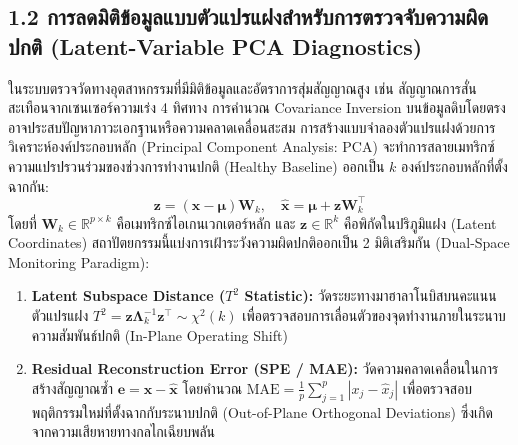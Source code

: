\documentclass[12pt,a4paper]{article}
\begin{document}
\subsection*{1.2 การลดมิติข้อมูลแบบตัวแปรแฝงสำหรับการตรวจจับความผิดปกติ (Latent-Variable PCA Diagnostics)}
\vspace{-4pt}

ในระบบตรวจวัดทางอุตสาหกรรมที่มีมิติข้อมูลและอัตราการสุ่มสัญญาณสูง เช่น สัญญาณการสั่นสะเทือนจากเซนเซอร์ความเร่ง 4 ทิศทาง การคำนวณ Covariance Inversion บนข้อมูลดิบโดยตรงอาจประสบปัญหาภาวะเอกฐานหรือความคลาดเคลื่อนสะสม การสร้างแบบจำลองตัวแปรแฝงด้วยการวิเคราะห์องค์ประกอบหลัก (Principal Component Analysis: PCA) จะทำการสลายเมทริกซ์ความแปรปรวนร่วมของช่วงการทำงานปกติ (Healthy Baseline) ออกเป็น $k$ องค์ประกอบหลักที่ตั้งฉากกัน:
\vspace{-2pt}
\begin{equation}
\mathbf{z} = (\mathbf{x} - \boldsymbol{\mu}) \mathbf{W}_k, \quad \hat{\mathbf{x}} = \boldsymbol{\mu} + \mathbf{z} \mathbf{W}_k^\top
\end{equation}
\vspace{-2pt}
โดยที่ $\mathbf{W}_k \in \mathbb{R}^{p \times k}$ คือเมทริกซ์ไอเกนเวกเตอร์หลัก และ $\mathbf{z} \in \mathbb{R}^k$ คือพิกัดในปริภูมิแฝง (Latent Coordinates) สถาปัตยกรรมนี้แบ่งการเฝ้าระวังความผิดปกติออกเป็น 2 มิติเสริมกัน (Dual-Space Monitoring Paradigm):
\begin{enumerate}[leftmargin=1.8em, itemsep=0pt, topsep=1pt, parsep=0pt]
    \item \textbf{Latent Subspace Distance ($T^2$ Statistic):} วัดระยะทางมาฮาลาโนบิสบนคะแนนตัวแปรแฝง $T^2 = \mathbf{z} \mathbf{\Lambda}_k^{-1} \mathbf{z}^\top \sim \chi^2(k)$ เพื่อตรวจสอบการเลื่อนตัวของจุดทำงานภายในระนาบความสัมพันธ์ปกติ (In-Plane Operating Shift)
    \item \textbf{Residual Reconstruction Error (SPE / MAE):} วัดความคลาดเคลื่อนในการสร้างสัญญาณซ้ำ $\mathbf{e} = \mathbf{x} - \hat{\mathbf{x}}$ โดยคำนวณ $\text{MAE} = \frac{1}{p} \sum_{j=1}^p |x_j - \hat{x}_j|$ เพื่อตรวจสอบพฤติกรรมใหม่ที่ตั้งฉากกับระนาบปกติ (Out-of-Plane Orthogonal Deviations) ซึ่งเกิดจากความเสียหายทางกลไกเฉียบพลัน
\end{enumerate}
\end{document}
